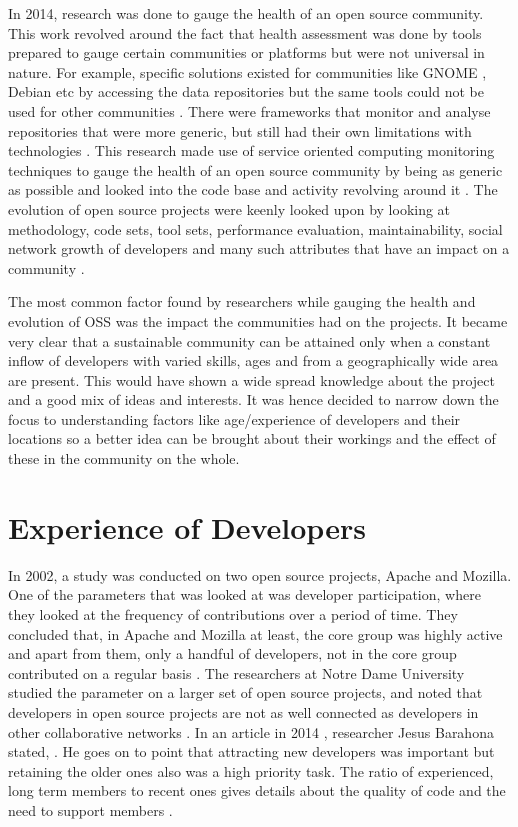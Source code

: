 \documentclass[seploa]{beavtex}
\begin{document}
In 2014, research was done to gauge the health of an open source community. This work revolved around the fact that health assessment was done by tools prepared to gauge certain communities or platforms but were not universal in nature. For example, specific solutions existed for communities like GNOME \cite{gno}, Debian \cite{ver2011} etc by accessing the data repositories but the same tools could not be used for other communities \cite{gno}. There were frameworks that monitor and analyse repositories that were more generic, but still had their own limitations with technologies \cite{marc2014}. This research made use of service oriented computing monitoring techniques to gauge the health of an open source community by being as generic as possible and looked into the code base and activity revolving around it \cite{marc2014}. The evolution of open source projects were keenly looked upon by looking at methodology, code sets, tool sets, performance evaluation, maintainability, social network growth of developers and many such attributes that have an impact on a community \cite{tarja2013}. 

The most common factor found by researchers while gauging the health and evolution of OSS was the impact the communities had on the projects. It became very clear that a sustainable community can be attained only when a constant inflow of developers with varied skills, ages and from a geographically wide area are present. This would have shown a wide spread knowledge about the project and a good mix of ideas and interests. It was hence decided to narrow down the focus to understanding factors like age/experience of developers and their locations so a better idea can be brought about their workings and the effect of these in the community on the whole.

\section{Experience of Developers}
In 2002, a study was conducted on two open source projects, Apache and Mozilla. One of the parameters that was looked at was developer participation, where they looked at the frequency of contributions
over a period of time. They concluded that, in Apache and Mozilla at least, the core group was highly active and apart from them, only a handful of developers, not in the core group contributed on a regular basis \cite{mockus2002}. The researchers at Notre Dame University studied the parameter on a larger set of open source projects, and noted that developers in open source projects are not as well connected as developers in other collaborative
networks \cite{greg2002}. In an article in 2014 \cite{jes2014}, researcher Jesus Barahona stated, . He goes on to point that attracting new developers was important but retaining the older ones also was a high priority task. The ratio of experienced, long term members to recent ones gives details about the quality of code and the need to support members \cite{jes2014}.
\end{document}
